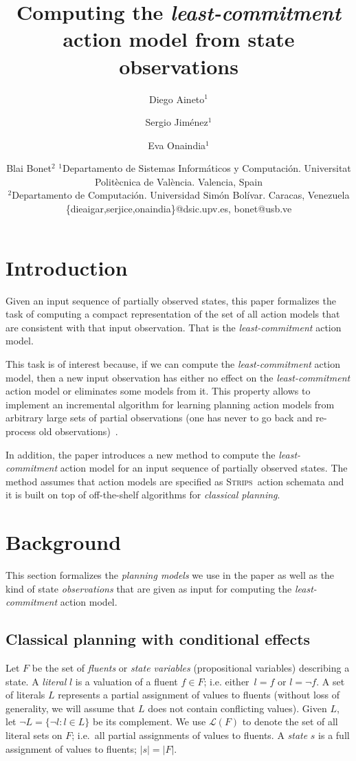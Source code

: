\documentclass{article}
\title{Computing the {\em least-commitment} action model from state observations}
\author{
Diego Aineto$^1$\and
Sergio Jim\'enez$^1$\and
Eva Onaindia$^1$\And
\and
Blai Bonet$^2$
\affiliations
$^1${\small Departamento de Sistemas Inform\'aticos y Computaci\'on. Universitat Polit\`ecnica de Val\`encia. Valencia, Spain}\\
$^2${\small Departamento de Computaci\'on. Universidad Sim\'on Bolívar. Caracas, Venezuela}
\emails
{\scriptsize \{dieaigar,serjice,onaindia\}@dsic.upv.es, bonet@usb.ve}}
\newcommand{\strips}{\textsc{Strips}}
\begin{document}
\maketitle

\begin{abstract}
  
\end{abstract}

\section{Introduction}
Given an input sequence of partially observed states, this paper formalizes the task of computing a compact representation of the set of all action models that are consistent with that input observation. That is the {\em least-commitment} action model.

This task is of interest because, if we can compute the {\em least-commitment} action model, then a new input observation has either no effect on the {\em least-commitment} action model or eliminates some models from it. This property allows to implement an incremental algorithm for learning planning action models from arbitrary large sets of partial observations (one has never to go back and re-process old observations)~\cite{mitchell1982generalization}. 

In addition, the paper introduces a new method to compute the {\em least-commitment} action model for an input sequence of partially observed states. The method assumes that action models are specified as \strips\ action schemata and it is built on top of off-the-shelf algorithms for {\em classical planning}.



\section{Background}
This section formalizes the {\em planning models} we use in the paper as well as the kind of state {\em observations} that are given as input for computing the {\em least-commitment} action model.  

\subsection{Classical planning with conditional effects}
Let $F$ be the set of {\em fluents} or {\em state variables} (propositional variables) describing a state. A {\em literal} $l$ is a valuation of a fluent $f\in F$; i.e. either~$l=f$ or $l=\neg f$. A set of literals $L$ represents a partial assignment of values to fluents (without loss of generality, we will assume that $L$ does not contain conflicting values). Given $L$, let $\neg L=\{\neg l:l\in L\}$ be its complement. We use $\mathcal{L}(F)$ to denote the set of all literal sets on $F$; i.e.~all partial assignments of values to fluents. A {\em state} $s$ is a full assignment of values to fluents; $|s|=|F|$.
\end{document}
